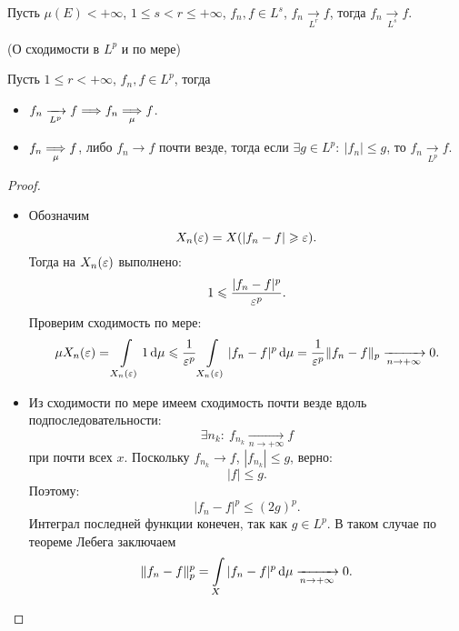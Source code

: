 \begin{corollary}
    Пусть $\mu(E) < +\infty$, $1 \leqslant s < r \leqslant +\infty$, $f_n, f \in L^s$,
    $f_n \xrightarrow[L^r]{} f$, тогда $f_n \xrightarrow[L^s]{} f$.
\end{corollary}

\begin{theorem}(О сходимости в $L^p$ и по мере)
    
    Пусть $1 \leqslant r < +\infty$, $f_n, f \in L^p$, тогда
    \begin{itemize}
        \item $f_n \xrightarrow[L^p]{} f \Longrightarrow f_n \underset{\mu}{\Longrightarrow} f$.
        \item $f_n \underset{\mu}{\Longrightarrow} f$, либо $f_n \to f$ почти везде, тогда
            если $\exists g \in L^p\colon~ |f_n| \leqslant g$, то
            $f_n \xrightarrow[L^p]{} f$.
    \end{itemize} 
\end{theorem}
\begin{proof}
    \enewline
    \begin{itemize}
        \item Обозначим
            \[
                X_n(\varepsilon) = X(|f_n - f| \geqslant \varepsilon)
            .\]
            Тогда на $X_n(\varepsilon)$ выполнено:
            \[
                1 \leqslant \frac{|f_n - f|^p}{\varepsilon^p}
            .\]
            Проверим сходимость по мере:
            \[
                \mu{X_n(\varepsilon)} = \int\limits_{X_n(\varepsilon)}{1 \,\mathrm{d} \mu} \leqslant
                \frac{1}{\varepsilon^p} \int\limits_{X_n(\varepsilon)}{|f_n - f|^p \,\mathrm{d} \mu} =
                \frac{1}{\varepsilon^p} \lVert f_n - f\rVert_p \xrightarrow[n \to +\infty]{} 0
            .\]
        \item Из сходимости по мере имеем сходимость почти везде вдоль
            подпоследовательности:
            \[
                \exists n_k \colon~ f_{n_k} \xrightarrow[n \to +\infty]{} f
            \]
            при почти всех $x$. Поскольку $f_{n_k} \to f$, $|f_{n_k}| \leqslant 
            g$, верно:
            \[
                |f| \leqslant g
            .\]
            Поэтому:
            \[
                |f_n - f|^p \leqslant (2 g)^p
            .\]
            Интеграл последней функции конечен, так как $g \in L^p$.
            В таком случае по теореме Лебега заключаем
            \[
                \lVert f_n - f\rVert^p_p = \int\limits_X{|f_n - f|^p \,\mathrm{d} \mu}
                \xrightarrow[n \to +\infty]{} 0
            .\]
    \end{itemize}
\end{proof}

